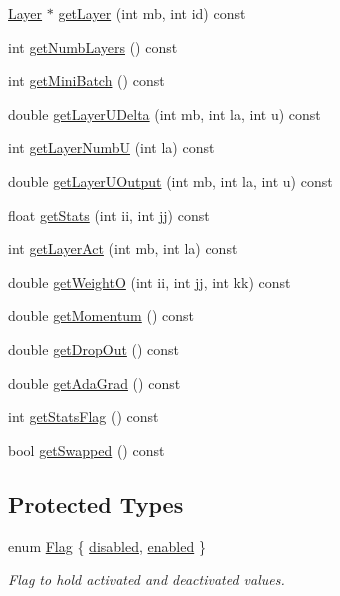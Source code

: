 \begin{DoxyCompactItemize}
\hyperlink{classLayer}{Layer} $\ast$ \hyperlink{classNeuralNetwork_a6e03934244dc6512a2d7a481cce51ffc}{get\+Layer} (int mb, int id) const 
\item 
int \hyperlink{classNeuralNetwork_a715c7cc10103a070b270c44b25924608}{get\+Numb\+Layers} () const 
\item 
int \hyperlink{classNeuralNetwork_aa264beacf67eeeb94a869647c07c692b}{get\+Mini\+Batch} () const 
\item 
double \hyperlink{classNeuralNetwork_a3182abfff4d633ac07cdfb35f32169ae}{get\+Layer\+U\+Delta} (int mb, int la, int u) const 
\item 
int \hyperlink{classNeuralNetwork_a516fbda3ce38841218d09bb823c17994}{get\+Layer\+NumbU} (int la) const 
\item 
double \hyperlink{classNeuralNetwork_ae61ce4f7b97b61398b0087afe6ac6d82}{get\+Layer\+U\+Output} (int mb, int la, int u) const 
\item 
float \hyperlink{classNeuralNetwork_a837e0348677eee2872de3f78de404870}{get\+Stats} (int ii, int jj) const 
\item 
int \hyperlink{classNeuralNetwork_ad9fccddee1743c2428bcc3e8bc3e29ae}{get\+Layer\+Act} (int mb, int la) const 
\item 
double \hyperlink{classNeuralNetwork_a660717474efe687f8b7b4bfadd643fee}{get\+WeightO} (int ii, int jj, int kk) const 
\item 
double \hyperlink{classNeuralNetwork_a73d05958b2b8a1f8c4ffb7a82509928f}{get\+Momentum} () const 
\item 
double \hyperlink{classNeuralNetwork_a92237c8f168045e56c6d3953d56dcc51}{get\+Drop\+Out} () const 
\item 
double \hyperlink{classNeuralNetwork_a5eaca7be1f8654a7bcd0ff8bdbd8dcfa}{get\+Ada\+Grad} () const 
\item 
int \hyperlink{classNeuralNetwork_adeafd6db805901beaad9930dda8c904b}{get\+Stats\+Flag} () const 
\item 
bool \hyperlink{classNeuralNetwork_a81f82e65356f4698fe412f7a2f6203da}{get\+Swapped} () const 
\end{DoxyCompactItemize}
\subsection*{Protected Types}
\begin{DoxyCompactItemize}
\item 
enum \hyperlink{classNeuralNetwork_a4c1c6e488b842002a6d327726ff92dc5}{Flag} \{ \hyperlink{classNeuralNetwork_a4c1c6e488b842002a6d327726ff92dc5a0a2addaf6a0e180369ecaecb25f84d64}{disabled}, 
\hyperlink{classNeuralNetwork_a4c1c6e488b842002a6d327726ff92dc5ab40dedbb237d7d5e7aeef947a8f1cbc6}{enabled}
 \}\begin{DoxyCompactList}\small\item\em Flag to hold activated and deactivated values. \end{DoxyCompactList}
\end{DoxyCompactItemize}
